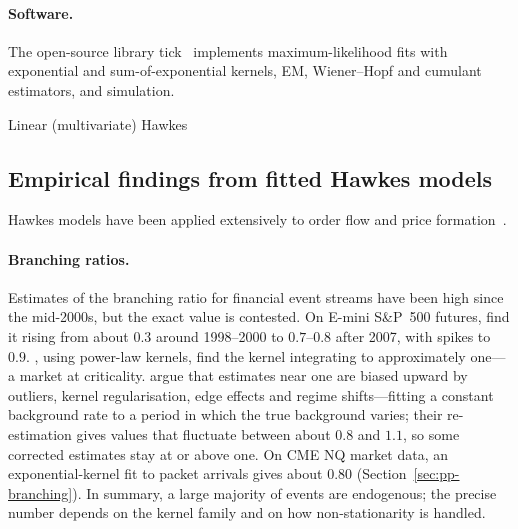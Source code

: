 \paragraph{Software.} The open-source library tick~\citep{bacry2018tick} implements maximum-likelihood
fits with exponential and sum-of-exponential kernels, EM, Wiener--Hopf and cumulant estimators, and
simulation.

\begin{modelcard}{Linear (multivariate) Hawkes}
\end{modelcard}

\subsection{Empirical findings from fitted Hawkes models}
\label{sec:hawkes-find}

Hawkes models have been applied extensively to order flow and price formation~\citep{bacry2015}.

\paragraph{Branching ratios.} Estimates of the branching ratio for financial event streams have
been high since the mid-2000s, but the exact value is contested. On E-mini S\&P~500 futures,
\citet{filimonovsornette2012} find it rising from about $0.3$ around 1998--2000 to $0.7$--$0.8$ after
2007, with spikes to $0.9$. \citet{hardimanbercotbouchaud2013}, using power-law kernels, find the
kernel integrating to approximately one---a market at criticality. \citet{filimonovsornette2015}
argue that estimates near one are biased upward by outliers, kernel regularisation, edge effects
and regime shifts---fitting a constant background rate to a period in which the true background
varies; their
re-estimation gives values that fluctuate between about $0.8$ and $1.1$, so some corrected estimates stay at or above one. On CME NQ market
data, an exponential-kernel fit to packet arrivals gives about $0.80$ (Section~\ref{sec:pp-branching}).
In summary, a large majority of events are endogenous; the precise
number depends on the kernel family and on how non-stationarity is handled.

